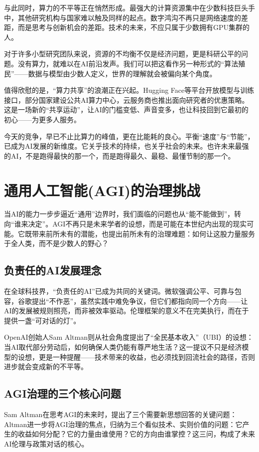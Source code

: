 与此同时，算力的不平等正在悄然形成。最强大的计算资源集中在少数科技巨头手中，其他研究机构与国家难以触及同样的起点。数字鸿沟不再只是网络速度的差距，而是思考与创新机会的差距。技术的未来，不应只属于少数拥有GPU集群的人。

对于许多小型研究团队来说，资源的不均衡不仅是经济问题，更是科研公平的问题。没有算力，就难以在AI前沿发声。我们可以把这看作另一种形式的“算法殖民”——数据与模型由少数人定义，世界的理解就会被偏向某个角度。

值得欣慰的是，“算力共享”的浪潮正在兴起。Hugging Face等平台开放模型与训练接口，部分国家建设公共AI算力中心，云服务商也推出面向研究者的优惠策略。这是一场新的“共享运动”，让AI的门槛变低、声音变多，也让科技回到它最初的初心——为更多人服务。

今天的竞争，早已不止比算力的峰值，更在比能耗的良心。平衡“速度”与“节能”，已成为AI发展的新维度。它关乎技术的持续，也关乎社会的未来。也许未来最强的AI，不是跑得最快的那一个，而是跑得最久、最稳、最懂节制的那一个。

\section{通用人工智能(AGI)的治理挑战}

当AI的能力一步步逼近“通用”边界时，我们面临的问题也从“能不能做到”，转向“谁来决定”。AGI不再只是未来学者的设想，而是可能在本世纪内出现的现实可能。它既带来前所未有的潜能，也提出前所未有的治理难题：如何让这股力量服务于全人类，而不是少数人的野心？

\subsection{负责任的AI发展理念}

在全球科技界，“负责任的AI”已成为共同的关键词。微软强调公平、可靠与包容，谷歌提出“不作恶”，虽然实践中难免争议，但它们都指向同一个方向——让AI的发展被规则照亮，而非被效率驱动。伦理框架的意义不在完美执行，而在于提供一盏“可对话的灯”。

OpenAI创始人Sam Altman则从社会角度提出了“全民基本收入”（UBI）的设想：当AI取代部分劳动后，如何确保人类仍能有尊严地生活？这一提议不只是经济模型的设想，更是一种提醒——技术带来的收益，也必须找到回流社会的路径，否则进步就会变成新的不平等。

\subsection{AGI治理的三个核心问题}

Sam Altman在思考AGI的未来时，提出了三个需要新思想回答的关键问题：
Altman进一步将AGI治理的焦点，归纳为三个看似技术、实则价值的问题：它产生的收益如何分配？它的力量由谁使用？它的方向由谁掌控？这三问，构成了未来AI伦理与政策对话的核心。


